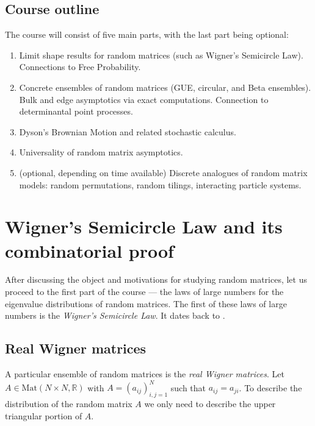 \documentclass[letterpaper,11pt,oneside,reqno]{amsart}
\numberwithin{equation}{section}
\theoremstyle{definition}
\begin{document}

\subsection{Course outline} %
\label{sub:goals_for_the_course}

The course will consist of five main parts, with the last part being optional:

\begin{enumerate}[\bf1.]
	\item Limit shape results for random matrices (such as Wigner's Semicircle Law). Connections to Free Probability.
	\item Concrete ensembles of random matrices (GUE, circular, and Beta ensembles). Bulk and edge asymptotics via exact computations. Connection to determinantal point processes.
	\item Dyson's Brownian Motion and related stochastic calculus.
	\item Universality of random matrix asymptotics.
	\item (optional, depending on time available) Discrete analogues of random matrix models: random permutations, random tilings, interacting particle systems.
\end{enumerate}



\section{Wigner's Semicircle Law and its combinatorial proof} %
\label{sec:wigner_s_semicircle_law}

After discussing the object and motivations for studying random matrices, let
us proceed to the first part of the course --- the laws of large numbers
for the eigenvalue distributions of random matrices. 
The first of these laws of large numbers is the 
\emph{Wigner's Semicircle Law}. It dates back to 
\cite{wigner1955characteristic}.

\subsection{Real Wigner matrices} %
\label{sub:real_wigner_matrices}

A particular ensemble of random matrices is the \emph{real Wigner matrices}.
Let $A\in \mathrm{Mat}(N\times N,\mathbb R)$ with $A=(a_{ij})_{i,j=1}^N$ such
that $a_{ij}=a_{ji}$. To describe the distribution of the random matrix $A$ we only need to
describe the upper triangular portion of $A$.
\end{document}
